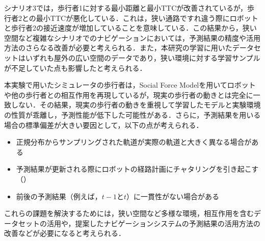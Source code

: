 シナリオ3では，歩行者1に対する最小距離と最小TTCが改善されているが，歩行者2との最小TTCが悪化している．これは，狭い通路ですれ違う際にロボットと歩行者2の接近速度が増加していることを意味している．この結果から，狭い空間など複雑なシナリオでのナビゲーションにおいては，予測結果の精度や活用方法のさらなる改善が必要と考えられる．また，本研究の学習に用いたデータセットはいずれも屋外の広い空間のデータであり，狭い環境に対する学習サンプルが不足していた点も影響したと考えられる．

本実験で用いたシミュレータの歩行者は，Social Force Model\cite{s-force-model}を用いてロボットや他の歩行者との相互作用を再現しているが，現実の歩行者の動きとは完全に一致しない．その結果，現実の歩行者の動きを重視して学習したモデルと実験環境の性質が乖離し，予測性能が低下した可能性がある．さらに，予測結果を用いる場合の標準偏差が大きい要因として，以下の点が考えられる．
\begin{itemize}
  \item 正規分布からサンプリングされた軌道が実際の軌道と大きく異なる場合がある
  \item 予測結果が更新される際にロボットの経路計画にチャタリングを引き起こす（）
  \item 前後の予測結果（例えば，$t-1\text{と}t$）に一貫性がない場合がある
\end{itemize}
これらの課題を解決するためには，狭い空間など多様な環境，相互作用を含むデータセットの活用や，提案したナビゲーションシステムの予測結果の活用方法の改善などが必要になると考えられる．

